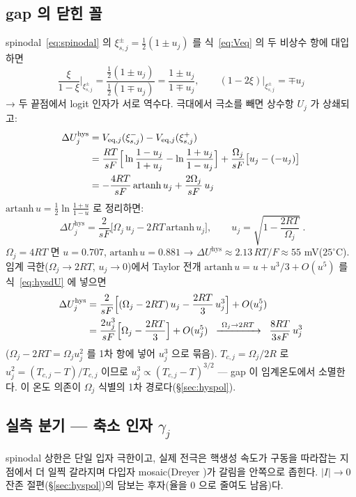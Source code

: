 \documentclass[11pt,a4paper]{article}
\newcommand{\eq}{\mathrm{eq}}
\newcommand{\hys}{\mathrm{hys}}
\begin{document}
\subsection{gap 의 닫힌 꼴}
spinodal~\eqref{eq:spinodal} 의 $\xi_{s,j}^\pm=\tfrac12(1\pm u_j)$ 를 식~\eqref{eq:Veq} 의 두 비상수 항에 대입하면
\begin{equation}
\frac{\xi}{1-\xi}\bigg|_{\xi_{s,j}^\pm}
=\frac{\tfrac12(1\pm u_j)}{\tfrac12(1\mp u_j)}
=\frac{1\pm u_j}{1\mp u_j},
\qquad
(1-2\xi)\Big|_{\xi_{s,j}^\pm}=\mp u_j
\label{eq:hyssub}
\end{equation}
→ 두 끝점에서 logit 인자가 서로 역수다. 극대에서 극소를 빼면 상수항 $U_j$ 가 상쇄되고:
\begin{align}
\Delta U_j^\hys
&=V_{\eq,j}(\xi_{s,j}^-)-V_{\eq,j}(\xi_{s,j}^+)\notag\\
&=\frac{RT}{sF}\Big[\ln\frac{1-u_j}{1+u_j}-\ln\frac{1+u_j}{1-u_j}\Big]
+\frac{\Omega_j}{sF}\big[u_j-(-u_j)\big]
\label{eq:hysdiff}\\
&=-\frac{4RT}{sF}\,\mathrm{artanh}\,u_j+\frac{2\Omega_j}{sF}\,u_j\notag
\end{align}
$\mathrm{artanh}\,u=\tfrac12\ln\tfrac{1+u}{1-u}$ 로 정리하면:
\begin{equation}
\boxed{\;\Delta U_j^\hys
=\frac{2}{sF}\Big[\Omega_j\,u_j-2RT\,\mathrm{artanh}\,u_j\Big],\qquad
u_j=\sqrt{1-\frac{2RT}{\Omega_j}}\;.}
\label{eq:hysdU}
\end{equation}
$\Omega_j=4RT$ 면 $u=0.707$, $\mathrm{artanh}\,u=0.881$ → $\Delta U^\hys\approx2.13\,RT/F\approx55$ mV($25^\circ$C). 임계 극한($\Omega_j\to2RT$, $u_j\to0$)에서 Taylor 전개 $\mathrm{artanh}\,u=u+u^3/3+O(u^5)$ 를 식~\eqref{eq:hysdU} 에 넣으면
\begin{align}
\Delta U_j^\hys
&=\frac{2}{sF}\Big[(\Omega_j-2RT)\,u_j-\frac{2RT}{3}\,u_j^3\Big]+O(u_j^5)\notag\\
&=\frac{2u_j^3}{sF}\Big[\Omega_j-\frac{2RT}{3}\Big]+O(u_j^5)
\;\;\xrightarrow{\ \Omega_j\to2RT\ }\;\;\frac{8RT}{3sF}\,u_j^3
\label{eq:hyscrit}
\end{align}
($\Omega_j-2RT=\Omega_ju_j^2$ 를 1차 항에 넣어 $u_j^3$ 으로 묶음). $T_{c,j}=\Omega_j/2R$ 로 $u_j^2=(T_{c,j}-T)/T_{c,j}$ 이므로 $u_j^3\propto(T_{c,j}-T)^{3/2}$ — gap 이 임계온도에서 소멸한다. 이 온도 의존이 $\Omega_j$ 식별의 1차 경로다(\S\ref{sec:hyspol}).

\subsection{실측 분기 — 축소 인자 $\gamma_j$}
spinodal 상한은 단일 입자 극한이고, 실제 전극은 핵생성 속도가 구동을 따라잡는 지점에서 더 일찍 갈라지며 다입자 mosaic(Dreyer \cite{dreyer2010})가 갈림을 안쪽으로 좁힌다. $|I|\to0$ 잔존 절편(\S\ref{sec:hyspol})의 담보는 후자(율을 $0$ 으로 줄여도 남음)다.
\end{document}
